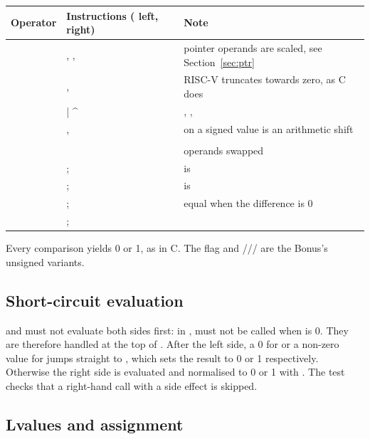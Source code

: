 \documentclass[12pt]{article}
\begin{document}
\begin{center}
\begin{tabularx}{\linewidth}{@{}lp{6.2cm}L@{}}
\toprule
Operator & Instructions ( left,  right) & Note \\
\midrule
\code{+ - *} & , ,  & pointer operands are scaled, see Section~\ref{sec:ptr} \\
\code{/ \%} & ,  & RISC-V truncates towards zero, as C does \\
\code{& | ^} & , ,  & \\
\code{<< >>} & ,  & \code{>>} on a signed value is an arithmetic shift \\
\code{<} &  & \\
\code{>} &  & operands swapped \\
\code{<=} & ;  &  is  \\
\code{>=} & ;  &  is  \\
\code{==} & ;  & equal when the difference is 0 \\
\code{!=} & ;  & \\
\bottomrule
\end{tabularx}
\end{center}

Every comparison yields 0 or 1, as in C. The  flag and ///
are the Bonus's unsigned variants.

\subsection{Short-circuit evaluation}

\code{&&} and \code{||} must not evaluate both sides first: in ,  must not be called
when  is 0. They are therefore handled at the top of . After the left side, a 0 for
\code{&&} or a non-zero value for \code{||} jumps straight to , which sets the result to 0 or 1
respectively. Otherwise the right side is evaluated and normalised to 0 or 1 with . The test
 checks that a right-hand call with a side effect is skipped.

\subsection{Lvalues and assignment}
\end{document}
